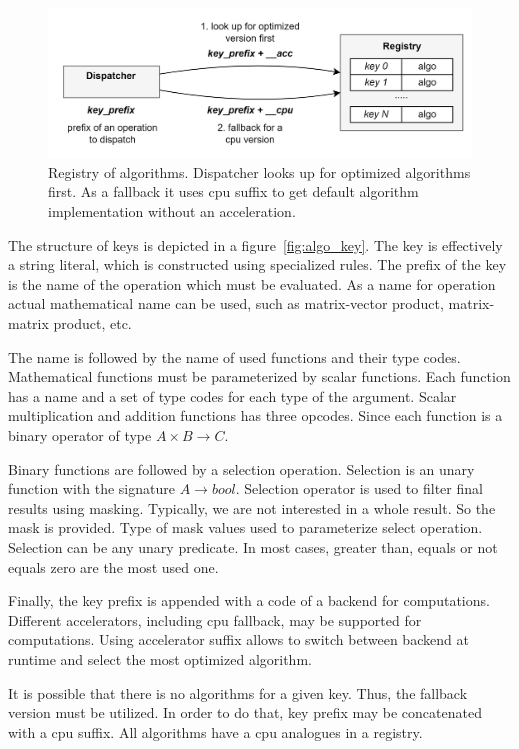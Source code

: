 \begin{figure}
    \centering
    \includegraphics[width=1.0\textwidth]{images/spla_algo_registry.png}
    \caption{Registry of algorithms. Dispatcher looks up for optimized algorithms first. As a fallback it uses cpu suffix to get default algorithm implementation without an acceleration.}
    \label{fig:algo_registry}
\end{figure}

The structure of keys is depicted in a figure~\ref{fig:algo_key}. The key is effectively a string literal, which is constructed using specialized rules. The prefix of the key is the name of the operation which must be evaluated. As a name for operation actual mathematical name can be used, such as matrix-vector product, matrix-matrix product, etc. 

The name is followed by the name of used functions and their type codes. Mathematical functions must be parameterized by scalar functions. Each function has a name and a set of type codes for each type of the argument. Scalar multiplication and addition functions has three opcodes. Since each function is a binary operator of type $A \times B \xrightarrow{} C$. 

Binary functions are followed by a selection operation. Selection is an unary function with the signature $A \xrightarrow{} bool$. Selection operator is used to filter final results using masking. Typically, we are not interested in a whole result. So the mask is provided. Type of mask values used to parameterize select operation. Selection can be any unary predicate. In most cases, greater than, equals or not equals zero are the most used one.

Finally, the key prefix is appended with a code of a backend  for computations. Different accelerators, including cpu fallback, may be supported for computations. Using accelerator suffix allows to switch between backend at runtime and select the most optimized algorithm. 

It is possible that there is no algorithms for a given key. Thus, the fallback version must be utilized. In order to do that, key prefix may be concatenated with a cpu suffix. All algorithms have a cpu analogues in a registry.

